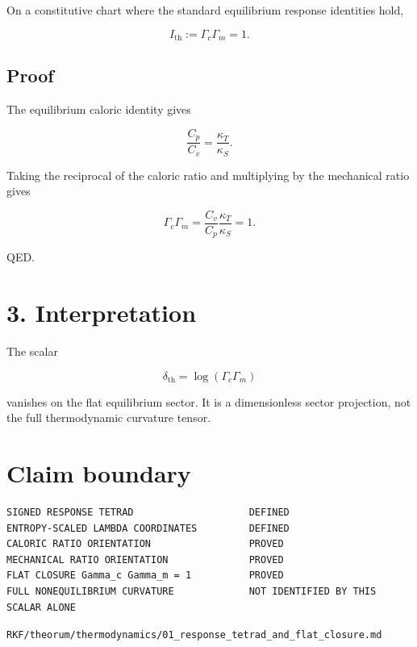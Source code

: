 On a constitutive chart where the standard equilibrium response identities hold,

\[
\boxed{
I_{\mathrm{th}}:=\Gamma_c\Gamma_m=1.
}
\]

\hypertarget{proof}{%
\subsection{Proof}\label{proof}}

The equilibrium caloric identity gives

\[
\frac{C_p}{C_v}=\frac{\kappa_T}{\kappa_S}.
\]

Taking the reciprocal of the caloric ratio and multiplying by the mechanical ratio gives

\[
\Gamma_c\Gamma_m
=\frac{C_v}{C_p}\frac{\kappa_T}{\kappa_S}=1.
\]

QED.

\hypertarget{interpretation}{%
\section{3. Interpretation}\label{interpretation}}

The scalar

\[
\delta_{\mathrm{th}}=\log(\Gamma_c\Gamma_m)
\]

vanishes on the flat equilibrium sector. It is a dimensionless sector projection, not the full thermodynamic curvature tensor.

\hypertarget{claim-boundary}{%
\section{Claim boundary}\label{claim-boundary}}

\begin{verbatim}
SIGNED RESPONSE TETRAD                    DEFINED
ENTROPY-SCALED LAMBDA COORDINATES         DEFINED
CALORIC RATIO ORIENTATION                 PROVED
MECHANICAL RATIO ORIENTATION              PROVED
FLAT CLOSURE Gamma_c Gamma_m = 1          PROVED
FULL NONEQUILIBRIUM CURVATURE             NOT IDENTIFIED BY THIS SCALAR ALONE
\end{verbatim}

\begin{flushright}\small\texttt{RKF/theorum/thermodynamics/01\_response\_tetrad\_and\_flat\_closure.md}\end{flushright}
